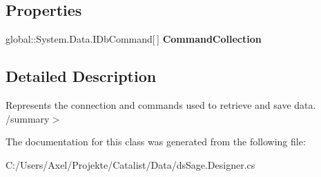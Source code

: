\subsection*{Properties}
\begin{DoxyCompactItemize}
\item 
global\+::\+System.\+Data.\+I\+Db\+Command\mbox{[}$\,$\mbox{]} {\bfseries Command\+Collection}\hypertarget{class_products_1_1_data_1_1ds_sage_table_adapters_1_1ta_queries_a0de4aaabcdfc37b41ab1e6229ed3b46a}{}\label{class_products_1_1_data_1_1ds_sage_table_adapters_1_1ta_queries_a0de4aaabcdfc37b41ab1e6229ed3b46a}

\end{DoxyCompactItemize}


\subsection{Detailed Description}
Represents the connection and commands used to retrieve and save data. /summary$>$ 

The documentation for this class was generated from the following file\+:\begin{DoxyCompactItemize}
\item 
C\+:/\+Users/\+Axel/\+Projekte/\+Catalist/\+Data/ds\+Sage.\+Designer.\+cs\end{DoxyCompactItemize}
